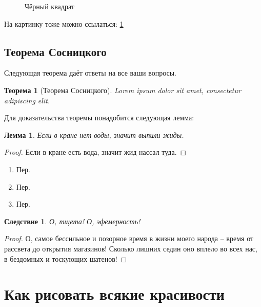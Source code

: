 \documentclass[14pt, a4paper, russian]{report}
\newtheorem{lemma}{\indent Лемма}
\newtheorem{theorem}{\indent Теорема}
\newtheorem{corollary}{\indent Следствие}
\begin{document}
\begin{normalsize}
\begin{figure}[H]
    \caption{\footnotesize{Чёрный квадрат}}
\label{fig:square}
\end{figure}

На картинку тоже можно ссылаться: \cref{fig:square}

\section{Теорема Сосницкого}
Следующая теорема даёт ответы на все ваши вопросы.

\begin{theorem}[Теорема Сосницкого]\label{th:sosnitsky}
Lorem ipsum dolor sit amet, consectetur adipiscing elit.
\end{theorem}

Для доказательства теоремы понадобится следующая лемма:

\begin{lemma}\label{le:sosnyakovsky}
Если в кране нет воды, значит выпили жиды.
\end{lemma}
\begin{proof}
Если в кране есть вода, значит жид нассал туда.

\end{proof}

\begin{enumerate}
\item Пер.
\item Пер.
\item Пер.
\end{enumerate}

\begin{corollary}\label{cor:erofeev}
О, тщета! О, эфемерность! 
\end{corollary}
\begin{proof}
О, самое бессильное и позорное время в жизни моего народа – время от рассвета до открытия магазинов! Сколько лишних седин оно вплело во всех нас, в бездомных и тоскующих шатенов!
\end{proof}

\chapter{Как рисовать всякие красивости}


\end{normalsize}
\end{document}
